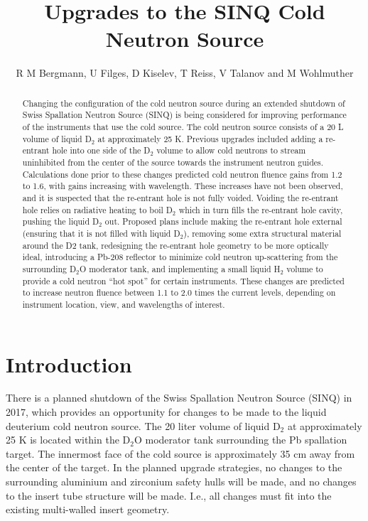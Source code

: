 \documentclass[a4paper]{jpconf}
\begin{document}
\title{Upgrades to the SINQ Cold Neutron Source}

\author{R M Bergmann, U Filges, D Kiselev, T Reiss, V Talanov and M Wohlmuther}

\address{Paul Scherrer Institut, 5232 Villigen, Switzerland}


\begin{abstract}Changing the configuration of the cold neutron source during an extended shutdown of Swiss Spallation Neutron Source (SINQ) is being considered for improving performance of the instruments that use the cold source.  The cold neutron source consists of a 20 L volume of liquid D$_2$ at approximately 25 K.  Previous upgrades included adding a re-entrant hole into one side of the D$_2$ volume to allow cold neutrons to stream uninhibited from the center of the source towards the instrument neutron guides.  Calculations done prior to these changes predicted cold neutron fluence gains from 1.2 to 1.6, with gains increasing with wavelength. These increases have not been observed, and it is suspected that the re-entrant hole is not fully voided.  Voiding the re-entrant hole relies on radiative heating to boil D$_2$ which in turn fills the re-entrant hole cavity, pushing the liquid D$_2$ out.  Proposed plans include making the re-entrant hole external (ensuring that it is not filled with liquid D$_2$), removing some extra structural material around the D2 tank, redesigning the re-entrant hole geometry to be more optically ideal, introducing a Pb-208 reflector to minimize cold neutron up-scattering from the surrounding D$_2$O moderator tank, and implementing a small liquid H$_2$ volume to provide a cold neutron “hot spot” for certain instruments.  These changes are predicted to increase neutron fluence between 1.1 to 2.0 times the current levels, depending on instrument location, view, and wavelengths of interest.
\end{abstract}


\section{Introduction}

There is a planned shutdown of the Swiss Spallation Neutron Source (SINQ) in 2017, which provides an opportunity for changes to be made to the liquid deuterium cold neutron source.  The 20 liter volume of liquid D$_2$ at approximately 25 K is located within the D$_2$O moderator tank surrounding the Pb spallation target.  The innermost face of the cold source is approximately 35 cm away from the center of the target.  In the planned upgrade strategies, no changes to the surrounding aluminium and zirconium safety hulls will be made, and no changes to the insert tube structure will be made.  I.e., all changes must fit into the existing multi-walled insert geometry.  
\end{document}
